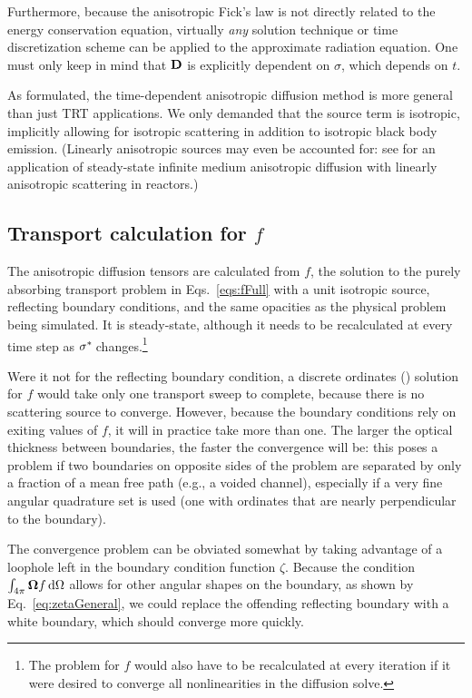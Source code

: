 Furthermore, because the anisotropic Fick's law is not directly related to the
energy conservation equation, virtually \emph{any} solution technique or time
discretization scheme can be applied to the approximate radiation equation. One
must only keep in mind that $\mathbf{D}$ is explicitly dependent on $\sigma$, which
depends on $t$.

As formulated, the time-dependent anisotropic diffusion method is more general
than just TRT applications. We only demanded that the source term is isotropic,
implicitly allowing for isotropic scattering in addition to isotropic black body
emission. (Linearly anisotropic sources may even be accounted for: see
\cite{Kel2010} for an application of steady-state infinite medium anisotropic
diffusion with linearly anisotropic scattering in reactors.)

\subsection{Transport calculation for \texorpdfstring{$f$}{f}}

The anisotropic diffusion tensors are calculated from $f$, the solution to the
purely absorbing transport problem in Eqs.~\eqref{eqs:fFull}  with a unit
isotropic source,
reflecting boundary conditions, and the same opacities as the physical problem
being simulated. It is steady-state, although it needs to be recalculated at
every time step as $\sigma^{*\!}$ changes.\footnote{The problem for $f$ would also
have to be recalculated at every iteration if it were desired to converge all
nonlinearities in the diffusion solve.}

Were it not for the reflecting boundary condition, a discrete ordinates (\SN)
solution for $f$ would take only one transport sweep to complete, because there
is no scattering source to converge. However, because the boundary conditions
rely on exiting values of $f$, it will in practice take more than one. The
larger the optical thickness between boundaries, the faster the convergence will
be: this poses a problem if
two boundaries on opposite sides of the problem are separated by only a
fraction of a mean free path (e.g., a voided channel), especially if a very fine
angular
quadrature set is used (one with ordinates that are nearly perpendicular to the
boundary).

The convergence problem can be obviated somewhat by taking advantage of a
loophole left in the boundary condition function $\zeta$. Because the condition
$\int_{4\pi} \bm{\Omega} f \mathop{}\!\mathrm{d}\Omega$ allows for other angular shapes on the
boundary, as shown by Eq.~\eqref{eq:zetaGeneral}, we could replace the
offending reflecting boundary with a white boundary, which should converge more
quickly.

